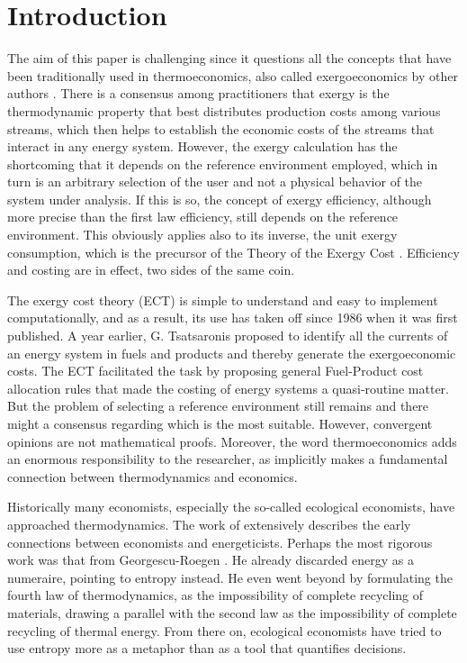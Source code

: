 \documentclass[energies,article,submit,moreauthors,pdftex]{Definitions/mdpi}
\begin{document}
\section{Introduction}
The aim of this paper is challenging since it questions all the concepts that have been traditionally used in thermoeconomics, also called exergoeconomics by other authors \cite{Tsatsaronis1985b}. There is a consensus among practitioners that exergy is the thermodynamic property that best distributes production costs among various streams, which then helps to establish the economic costs of the streams that interact in any energy system. However, the exergy calculation has the shortcoming that it depends on the reference environment employed, which in turn is an arbitrary selection of the user and not a physical behavior of the system under analysis. If this is so, the concept of exergy efficiency, although more precise than the first law efficiency, still depends on the reference environment. This obviously applies also to its inverse, the unit exergy consumption, which is the precursor of the Theory of the Exergy Cost \cite{Valero1986a,Lozano1993}. Efficiency and costing are in effect, two sides of the same coin.

The exergy cost theory (ECT) is simple to understand and easy to implement computationally, and as a result, its use has taken off since 1986 when it was first published. A year earlier, G. Tsatsaronis proposed to identify all the currents of an energy system in fuels and products and thereby generate the exergoeconomic costs. The ECT facilitated the task by proposing general Fuel-Product cost allocation rules that made the costing of energy systems a quasi-routine matter. But the problem of selecting a reference environment still remains and there might a consensus regarding which is the most suitable. However, convergent opinions are not mathematical proofs. Moreover, the word thermoeconomics adds an enormous responsibility to the researcher, as implicitly makes a fundamental connection between thermodynamics and economics.

Historically many economists, especially the so-called ecological economists, have approached thermodynamics. The work of  \cite{MartinezAlier1987} extensively describes the early connections between economists and energeticists. Perhaps the most rigorous work was that from Georgescu-Roegen \cite{GeorgescuRoegen1971}. He already discarded energy as a numeraire, pointing to entropy instead. He even went beyond by formulating the fourth law of thermodynamics, as the impossibility of complete recycling of materials, drawing a parallel with the second law as the impossibility of complete recycling of thermal energy. From there on, ecological economists have tried to use entropy more as a metaphor than as a tool that quantifies decisions.
\end{document}
